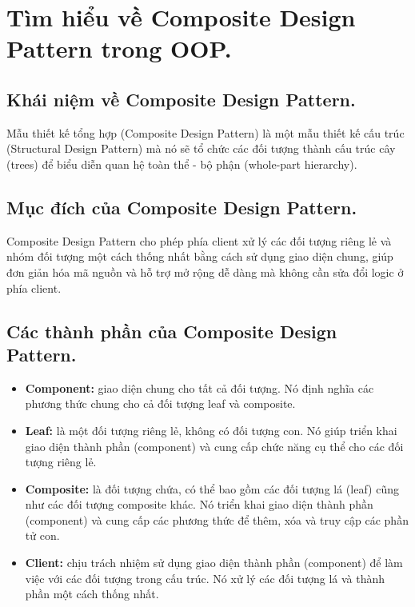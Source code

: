 \section{Tìm hiểu về Composite Design Pattern trong OOP.}

\subsection{Khái niệm về Composite Design Pattern.}
Mẫu thiết kế tổng hợp (Composite Design Pattern) là một mẫu thiết kế cấu trúc (Structural Design Pattern) 
mà nó sẽ tổ chức các đối tượng thành cấu trúc cây (trees) để biểu diễn quan hệ toàn thể - bộ phận (whole-part hierarchy).

\subsection{Mục đích của Composite Design Pattern.}
Composite Design Pattern cho phép phía client xử lý các đối tượng riêng lẻ và nhóm đối tượng một cách thống nhất bằng cách sử dụng giao diện chung, 
giúp đơn giản hóa mã nguồn và hỗ trợ mở rộng dễ dàng mà không cần sửa đổi logic ở phía client.

\subsection{Các thành phần của Composite Design Pattern.}
\begin{itemize}
    \item[$-$] \textbf{Component:} giao diện chung cho tất cả đối tượng. 
                Nó định nghĩa các phương thức chung cho cả đối tượng leaf và composite.
    \item[$-$] \textbf{Leaf:} là một đối tượng riêng lẻ, không có đối tượng con. 
                Nó giúp triển khai giao diện thành phần (component) và cung cấp chức năng cụ thể cho các đối tượng riêng lẻ.
    \item[$-$] \textbf{Composite:} là đối tượng chứa, có thể bao gồm các đối tượng lá (leaf) cũng như các đối tượng composite khác. 
                Nó triển khai giao diện thành phần (component) và cung cấp các phương thức để thêm, xóa và truy cập các phần tử con.
    \item[$-$] \textbf{Client:} chịu trách nhiệm sử dụng giao diện thành phần (component) để làm việc với các đối tượng trong cấu trúc. 
                Nó xử lý các đối tượng lá và thành phần một cách thống nhất.
\end{itemize}

